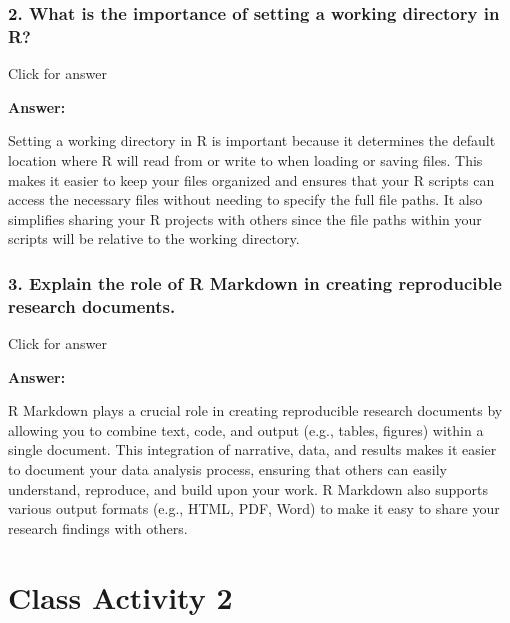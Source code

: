 \documentclass[
]{book}
\begin{document}
\vspace*{0.5in}

\hypertarget{what-is-the-importance-of-setting-a-working-directory-in-r}{%
\subsection{2. What is the importance of setting a working directory in R?}\label{what-is-the-importance-of-setting-a-working-directory-in-r}}

Click for answer

\textbf{Answer:}

Setting a working directory in R is important because it determines the default location where R will read from or write to when loading or saving files. This makes it easier to keep your files organized and ensures that your R scripts can access the necessary files without needing to specify the full file paths. It also simplifies sharing your R projects with others since the file paths within your scripts will be relative to the working directory.

\vspace*{0.5in}

\hypertarget{explain-the-role-of-r-markdown-in-creating-reproducible-research-documents.}{%
\subsection{3. Explain the role of R Markdown in creating reproducible research documents.}\label{explain-the-role-of-r-markdown-in-creating-reproducible-research-documents.}}

Click for answer

\textbf{Answer:}

R Markdown plays a crucial role in creating reproducible research documents by allowing you to combine text, code, and output (e.g., tables, figures) within a single document. This integration of narrative, data, and results makes it easier to document your data analysis process, ensuring that others can easily understand, reproduce, and build upon your work. R Markdown also supports various output formats (e.g., HTML, PDF, Word) to make it easy to share your research findings with others.

\hypertarget{class-activity-2}{%
\chapter{Class Activity 2}\label{class-activity-2}}
\end{document}
